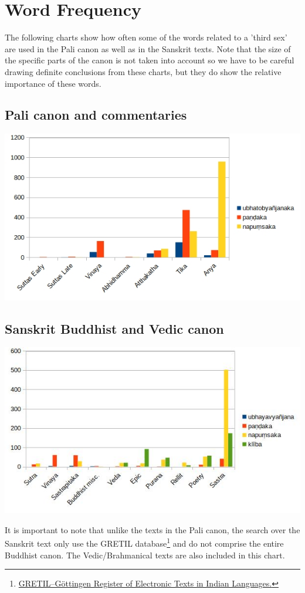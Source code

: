 \section{Word Frequency}
\label{appendix2}

The following charts show how often some of the words related to a 'third sex' are used in the Pali canon as well as in the Sanskrit texts. Note that the size of the specific parts of the canon is not taken into account so we have to be careful drawing definite conclusions from these charts, but they do show the relative importance of these words. 

\subsection{Pali canon and commentaries}

\includegraphics[width=0.7\linewidth]{pali.jpg}
\label{pali1}

\subsection{Sanskrit Buddhist and Vedic canon}

\includegraphics[width=0.7\linewidth]{sanskrit.jpg}
\label{sanskrit1}

\medskip
It is important to note that unlike the texts in the Pali canon, the search over the Sanskrit text only use the GRETIL database\footnote{\href{http://gretil.sub.uni-goettingen.de/gretil.html}{GRETIL--Göttingen Register of Electronic Texts in Indian Languages.}} and do not comprise the entire Buddhist canon. The Vedic/Brahmanical texts are also included in this chart.
